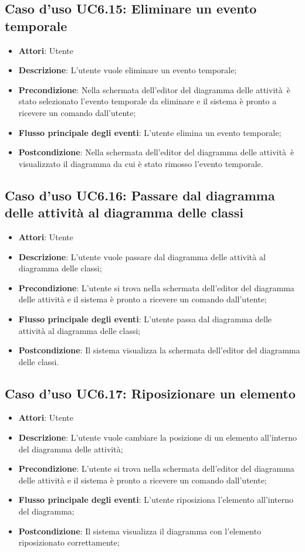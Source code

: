\documentclass[../AnalisiDeiRequisiti.tex]{subfiles}
\begin{document}
				\subsection{Caso d'uso UC6.15: Eliminare un evento temporale}
				\begin{itemize}
					\item \textbf{Attori}: Utente
					\item \textbf{Descrizione}: L'utente vuole eliminare un evento temporale;
					\item \textbf{Precondizione}: Nella schermata dell'editor del diagramma delle attività è stato selezionato l'evento temporale da eliminare e il sistema è pronto a ricevere un comando dall'utente;
					\item \textbf{Flusso principale degli eventi}: L'utente elimina un evento temporale;
					\item \textbf{Postcondizione}: Nella schermata dell'editor del diagramma delle attività è visualizzato il diagramma da cui è stato rimosso l'evento temporale.
				\end{itemize}
				\subsection{Caso d'uso UC6.16: Passare dal diagramma delle attività al diagramma delle classi}
				\begin{itemize}
					\item \textbf{Attori}: Utente
					\item \textbf{Descrizione}: L'utente vuole passare dal diagramma delle attività al diagramma delle classi;
					\item \textbf{Precondizione}: L'utente si trova nella schermata dell'editor del diagramma delle attività e il sistema è pronto a ricevere un comando dall'utente;
					\item \textbf{Flusso principale degli eventi}: L'utente passa dal diagramma delle attività al diagramma delle classi;
					\item \textbf{Postcondizione}: Il sistema visualizza la schermata dell'editor del diagramma delle classi.
				\end{itemize}
				\subsection{Caso d'uso UC6.17: Riposizionare un elemento}
				\begin{itemize}
					\item \textbf{Attori}: Utente
					\item \textbf{Descrizione}: L'utente vuole cambiare la posizione di un elemento all'interno del diagramma delle attività;
					\item \textbf{Precondizione}: L'utente si trova nella schermata dell'editor del diagramma delle attività e il sistema è pronto a ricevere un comando dall'utente;
					\item \textbf{Flusso principale degli eventi}: L'utente riposiziona l'elemento all'interno del diagramma;
					\item \textbf{Postcondizione}: Il sistema visualizza il diagramma con l'elemento riposizionato correttamente;
				\end{itemize}
\end{document}
